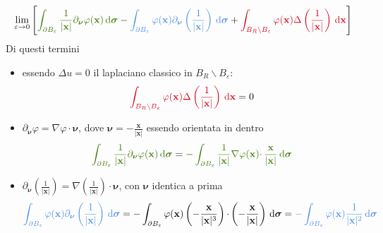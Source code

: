 \documentclass[10pt,a4paper,twoside,openright]{book}
\newcommand{\x}{\mathbf{x}}
\newcommand{\sigg}{\bm{\sigma}}
\newcommand{\nuu}{\bm{\nu}}
\newcommand{\de}{\,\mathrm d}
\newcommand{\dxx}{\de \x}
\newcommand{\dsig}{\de \sigg}
\begin{document}
\begin{equation}
	\lim _{\varepsilon \rightarrow 0}\left[\textcolor[rgb]{0.25,0.46,0.02}{\int _{\partial B_{\varepsilon }}\frac{1}{| \x| } \partial _{\nuu} \varphi (\x) \dsig } -\textcolor[rgb]{0.29,0.56,0.89}{\int _{\partial B_{\varepsilon }} \varphi (\x) \partial _{\nuu}\left(\frac{1}{| \x| }\right) \dsig } +\textcolor[rgb]{0.82,0.01,0.11}{\int _{B_{R} \backslash B_{\varepsilon }} \varphi (\x) \Delta \left(\frac{1}{| \x| }\right) \dxx}\right]
	\label{eq:esempio-derivata-limite-2}
\end{equation}
Di questi termini
\begin{itemize}
	\item essendo $\displaystyle \Delta u=0$ il laplaciano classico in $\displaystyle B_{R} \backslash B_{\varepsilon }$:
	\begin{equation*}
	      \textcolor[rgb]{0.82,0.01,0.11}{\int _{B_{R} \backslash B_{\varepsilon }} \varphi (\x) \Delta \left(\frac{1}{| \x| }\right) \dxx} =0
	\end{equation*}
	\item  $\displaystyle \partial _{\nuu} \varphi =\nabla \varphi \cdotp \nuu$, dove $\displaystyle \nuu =-\frac{\x}{| \x| }$ essendo orientata in dentro
	\begin{equation*}
	      \textcolor[rgb]{0.25,0.46,0.02}{\int _{\partial B_{\varepsilon }}\frac{1}{| \x| } \partial _{\nuu} \varphi (\x) \dsig } =\textcolor[rgb]{0.25,0.46,0.02}{-\int _{\partial B_{\varepsilon }}\frac{1}{| \x| } \nabla \varphi (\x) \cdotp \frac{\x}{| \x| } \dsig }
	\end{equation*}
	\item $\displaystyle \partial _{\nuu}\left(\frac{1}{| \x| }\right) =\nabla \left(\frac{1}{| \x| }\right) \cdotp \nuu$, con $\displaystyle \nuu$ identica a prima
	\begin{equation*}
	      \textcolor[rgb]{0.29,0.56,0.89}{\int _{\partial B_{\varepsilon }} \varphi (\x) \partial_{\nuu}\left(\frac{1}{| \x| }\right) \dsig } =-\int _{\partial B_{\varepsilon }} \varphi (\x)\left(-\frac{\x}{| \x| ^{3}}\right) \cdotp \left(-\frac{\x}{| \x| }\right) \dsig =\textcolor[rgb]{0.29,0.56,0.89}{-\int _{\partial B_{\varepsilon }} \varphi (\x)\frac{1}{| \x| ^{2}} \dsig }
	\end{equation*}
\end{itemize}
\end{document}
